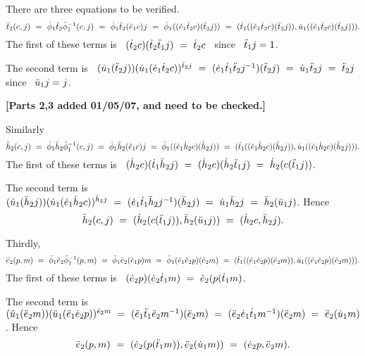 \begin{pf}
There are three equations to be verified. 
$$
\bar{t}_2(c,j)
~=~ \dot{\phi}_1\ddot{t}_2\ddot{\phi}_1^{-1}(c,j) \\
~=~ \dot{\phi}_1\ddot{t}_2(\ddot{e}_1 c)j \\
~=~ \dot{\phi}_1((\dot{e}_1\dot{t}_2 c)(\ddot{t}_2 j)) \\
~=~ (\dot{t}_1((\dot{e}_1\dot{t}_2 c)(\ddot{t}_2 j)), \dot{u}_1((\dot{e}_1\dot{t}_2 c)(\ddot{t}_2 j))).
$$
The first of these terms is~
$(\dot{t}_2 c)(\dot{t}_2\ddot{t}_1 j) ~=~ \dot{t}_2 c$~ since ~$\ddot{t}_1 j = 1$.

\medskip\noindent
The second term is~
$(\dot{u}_1(\ddot{t}_2 j))(\dot{u}_1(\dot{e}_1\dot{t}_2 c))^{\ddot{t}_2 j}
~=~ (\dot{e}_1\dot{t}_1\ddot{t}_2 j^{-1})(\ddot{t}_2 j) ~=~ \dot{u}_1\ddot{t}_2 j ~=~ \ddot{t}_2 j$~ 
since ~$\ddot{u}_1 j = j$. 

\medskip\noindent
{\bf [Parts 2,3 added 01/05/07, and need to be checked.]}

\medskip\noindent 
Similarly 
$$
\bar{h}_2(c,j)
~=~ \dot{\phi}_1\ddot{h}_2\ddot{\phi}_1^{-1}(c,j) \\
~=~ \dot{\phi}_1\ddot{h}_2(\ddot{e}_1 c)j \\
~=~ \dot{\phi}_1((\dot{e}_1\dot{h}_2 c)(\ddot{h}_2 j)) \\
~=~ (\dot{t}_1((\dot{e}_1\dot{h}_2 c)(\ddot{h}_2 j)), \dot{u}_1((\dot{e}_1\dot{h}_2 c)(\ddot{h}_2 j))).
$$
The first of these terms is~
$(\dot{h}_2 c)(\dot{t}_1\ddot{h}_2 j) ~=~ (\dot{h}_2 c)(\dot{h}_2 \ddot{t}_1 j) 
                          ~=~ \dot{h}_2(c(\ddot{t}_1 j))$. 

\medskip\noindent
The second term is~
$(\dot{u}_1(\ddot{h}_2 j))(\dot{u}_1(\dot{e}_1\dot{h}_2 c))^{\ddot{h}_2 j}
~=~ (\dot{e}_1\dot{t}_1\ddot{h}_2 j^{-1})(\ddot{h}_2 j) ~=~ \dot{u}_1\ddot{h}_2 j 
                                        ~=~ \ddot{h}_2(\ddot{u}_1 j)$.
Hence
$$
\bar{h}_2(c,j) ~=~ (\dot{h}_2(c(\ddot{t}_1 j)), \ddot{h}_2(\ddot{u}_1 j)) ~=~ (\dot{h}_2 c,\ddot{h}_2 j).
$$

\medskip\noindent
Thirdly, 
$$
\bar{e}_2(p,m)
~=~ \ddot{\phi}_1\ddot{e}_2\ddot{\phi}_1^{-1}(p,m) \\
~=~ \ddot{\phi}_1\ddot{e}_2(\dot{e}_1 p)m \\
~=~ \ddot{\phi}_1(\ddot{e}_1\dot{e}_2 p)(\ddot{e}_2 m) \\
~=~ (\ddot{t}_1((\ddot{e}_1\dot{e}_2 p)(\ddot{e}_2 m)), \ddot{u}_1((\ddot{e}_1\dot{e}_2 p)(\ddot{e}_2 m))).
$$
The first of these terms is~
$(\dot{e}_2 p)(\dot{e}_2\dot{t}_1 m) ~=~ \dot{e}_2(p(\dot{t}_1 m)$. 

\medskip\noindent
The second term is 
$(\ddot{u}_1(\ddot{e}_2 m))(\ddot{u}_1(\ddot{e}_1\dot{e}_2 p))^{\ddot{e}_2 m} 
~=~ (\ddot{e}_1\ddot{t}_1\ddot{e}_2 m^{-1})(\ddot{e}_2 m) 
~=~ (\ddot{e}_2\dot{e}_1\dot{t}_1 m^{-1})(\ddot{e}_2 m) 
~=~ \ddot{e}_2(\dot{u}_1 m)$. 
Hence
$$
\bar{e}_2(p,m) ~=~ (\dot{e}_2(p(\ddot{t}_1 m)), \ddot{e}_2(\dot{u}_1 m)) ~=~ (\dot{e}_2 p,\ddot{e}_2 m).
$$
\end{pf}

